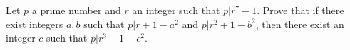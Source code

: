 Let $p$ a prime number and $r$ an integer such that $p|r^7-1$. Prove that if there exist integers $a, b$ such that $p|r+1-a^2$ and $p|r^2+1-b^2$, then there exist an integer $c$ such that $p|r^3+1-c^2$.